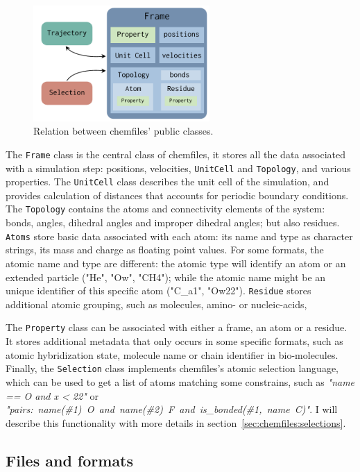 \documentclass[thesis]{subfiles}
\begin{document}
\begin{figure}[ht]
    \centering
    \includegraphics[width=0.6\textwidth]{figures/images/chemfiles-classes}
    \caption{Relation between chemfiles' public classes.}
    \label{fig:chemfiles:classes}
\end{figure}

The \texttt{Frame} class is the central class of chemfiles, it stores all the
data associated with a simulation step: positions, velocities, \texttt{UnitCell}
and \texttt{Topology}, and various properties. The \texttt{UnitCell} class
describes the unit cell of the simulation, and provides calculation of distances
that accounts for periodic boundary conditions. The \texttt{Topology} contains
the atoms and connectivity elements of the system: bonds, angles, dihedral
angles and improper dihedral angles; but also residues. \texttt{Atoms} store
basic data associated with each atom: its name and type as character strings,
its mass and charge as floating point values. For some formats, the atomic name
and type are different: the atomic type will identify an atom or an extended
particle ("He", "Ow", "CH4"); while the atomic name might be an unique
identifier of this specific atom ("C\_a1", "Ow22"). \texttt{Residue} stores
additional atomic grouping, such as molecules, amino- or nucleic-acids, \etc

The \texttt{Property} class can be associated with either a frame, an atom or a
residue. It stores additional metadata that only occurs in some specific
formats, such as atomic hybridization state, molecule name or chain identifier
in bio-molecules. Finally, the \texttt{Selection} class implements chemfiles's
atomic selection language, which can be used to get a list of atoms matching
some constrains, such as \emph{"name == O and x < 22"} or \mbox{\emph{"pairs:
name(\#1) O and name(\#2) F and is\_bonded(\#1, name C)"}}. I will describe this
functionality with more details in section~\ref{sec:chemfiles:selections}.

\subsection{Files and formats}
\label{sec:chemfiles:formats}
\end{document}
